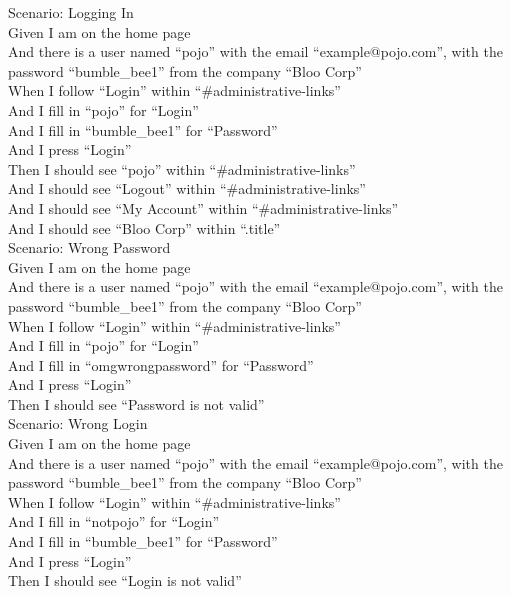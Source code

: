 \documentclass[12pt]{article}
\begin{document}
\begin{hangparas}{0.25in}{1}
Scenario: Logging In \\
Given I am on the home page \\
And there is a user named ``pojo'' with the email ``example@pojo.com'', with the password ``bumble\_bee1'' from the company ``Bloo Corp'' \\
When I follow ``Login'' within ``\#administrative-links'' \\
And I fill in ``pojo'' for ``Login'' \\
And I fill in ``bumble\_bee1'' for ``Password'' \\
And I press ``Login'' \\
Then I should see ``pojo'' within ``\#administrative-links'' \\
And I should see ``Logout'' within ``\#administrative-links'' \\
And I should see ``My Account'' within ``\#administrative-links'' \\
And I should see ``Bloo Corp'' within ``.title'' \\

Scenario: Wrong Password \\
  Given I am on the home page \\
  And there is a user named ``pojo'' with the email ``example@pojo.com'', with the password ``bumble\_bee1'' from the company ``Bloo Corp'' \\
  When I follow ``Login'' within ``\#administrative-links'' \\
  And I fill in ``pojo'' for ``Login'' \\
  And I fill in ``omgwrongpassword'' for ``Password'' \\
  And I press ``Login'' \\
  Then I should see ``Password is not valid'' \\

Scenario: Wrong Login \\
  Given I am on the home page \\
  And there is a user named ``pojo'' with the email ``example@pojo.com'', with the password ``bumble\_bee1'' from the company ``Bloo Corp'' \\
  When I follow ``Login'' within ``\#administrative-links'' \\
  And I fill in ``notpojo'' for ``Login'' \\
  And I fill in ``bumble\_bee1'' for ``Password'' \\
  And I press ``Login'' \\
  Then I should see ``Login is not valid'' \\


\end{hangparas}
\end{document}
